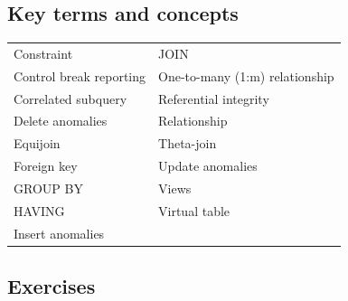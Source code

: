 \documentclass[
]{article}
\begin{document}
\hypertarget{key-terms-and-concepts-1}{%
\subsection*{Key terms and concepts}\label{key-terms-and-concepts-1}}

\begin{longtable}[]{@{}ll@{}}
\toprule
& \\
\midrule
\endhead
Constraint & JOIN \\
Control break reporting & One-to-many (1:m) relationship \\
Correlated subquery & Referential integrity \\
Delete anomalies & Relationship \\
Equijoin & Theta-join \\
Foreign key & Update anomalies \\
GROUP BY & Views \\
HAVING & Virtual table \\
Insert anomalies & \\
\bottomrule
\end{longtable}

\hypertarget{exercises-3}{%
\subsection*{Exercises}\label{exercises-3}}
\end{document}
